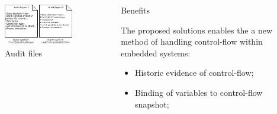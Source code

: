 \documentclass[final]{beamer}
\newlength{\sepwid}
\newlength{\onecolwid}
\newlength{\twocolwid}
\begin{document}
\begin{frame}[t]
\begin{columns}[t]
\begin{column}{\twocolwid}
\begin{columns}[t,totalwidth=\twocolwid]
\begin{column}{\onecolwid}
\begin{figure}
\includegraphics[width=\linewidth]{images/Files.png}
\caption{Audit files}
\vspace{-1cm}
\end{figure}

\end{column} %

\end{columns} %

\end{column} %


\begin{column}{\sepwid}\end{column} %

\begin{column}{\onecolwid} %

\begin{alertblock}{Benefits}

The proposed solutions enables the a new method of handling control-flow within embedded systems:
\begin{itemize}
\item Historic evidence of control-flow;
\item Binding of variables to control-flow snapshot;
\end{itemize}

\end{alertblock}


\end{column}
\end{columns}
\end{frame}
\end{document}
